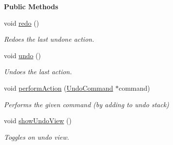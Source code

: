 \begin{Indent}\textbf{ Public Methods}\par
\begin{DoxyCompactItemize}
\item 
\mbox{\label{classrev_1_1_action_manager_a9c1ebb83e954c9ec83eebb2f5b0f3f95}} 
void \mbox{\hyperlink{classrev_1_1_action_manager_a9c1ebb83e954c9ec83eebb2f5b0f3f95}{redo}} ()
\begin{DoxyCompactList}\small\item\em Redoes the last undone action. \end{DoxyCompactList}\item 
\mbox{\label{classrev_1_1_action_manager_afa766c6ae2a62c27e4edbb846174611c}} 
void \mbox{\hyperlink{classrev_1_1_action_manager_afa766c6ae2a62c27e4edbb846174611c}{undo}} ()
\begin{DoxyCompactList}\small\item\em Undoes the last action. \end{DoxyCompactList}\item 
\mbox{\label{classrev_1_1_action_manager_ac2713f8a36a46842c1d12b7869f5be1f}} 
void \mbox{\hyperlink{classrev_1_1_action_manager_ac2713f8a36a46842c1d12b7869f5be1f}{perform\+Action}} (\mbox{\hyperlink{classrev_1_1_undo_command}{Undo\+Command}} $\ast$command)
\begin{DoxyCompactList}\small\item\em Performs the given command (by adding to undo stack) \end{DoxyCompactList}\item 
\mbox{\label{classrev_1_1_action_manager_a13d452d317e0b2c3eea8ea03f4b89eee}} 
void \mbox{\hyperlink{classrev_1_1_action_manager_a13d452d317e0b2c3eea8ea03f4b89eee}{show\+Undo\+View}} ()
\begin{DoxyCompactList}\small\item\em Toggles on undo view. \end{DoxyCompactList}\end{DoxyCompactItemize}
\end{Indent}
